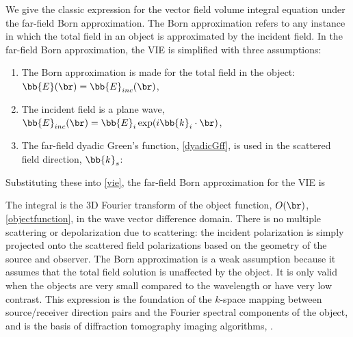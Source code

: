 We give the classic expression for the vector field volume integral equation under the far-field Born approximation. The Born approximation refers to any instance in which the total field in an object is approximated by the incident field. In the far-field Born approximation, the VIE is simplified with three assumptions:
\begin{enumerate}
\item The Born approximation is made for the total field in the object: $\bb{E}(\br) = \bb{E}_{inc}(\br)$,
\item The incident field is a plane wave, $\bb{E}_{inc}(\br) = \bb{E}_i\exp(i \bb{k}_i \cdot \br)$,
\item The far-field dyadic Green's function, \eqref{dyadicGff}, is used in the scattered field direction, $\bb{k}_s$:
\end{enumerate}

Substituting these into \eqref{vie}, the far-field Born approximation for the VIE is 

The integral is the 3D Fourier transform of the object function, $O(\br)$, \eqref{objectfunction}, in the wave vector difference domain. There is no multiple scattering or depolarization due to scattering: the incident polarization is simply projected onto the scattered field polarizations based on the geometry of the source and observer. The Born approximation is a weak assumption because it assumes that the total field solution is unaffected by the object. It is only valid when the objects are very small compared to the wavelength or have very low contrast. This expression is the foundation of the $k$-space mapping between source/receiver direction pairs and the Fourier spectral components of the object, and is the basis of diffraction tomography imaging algorithms, \cite{devaney1984geophysical,chew1995waves}. 



